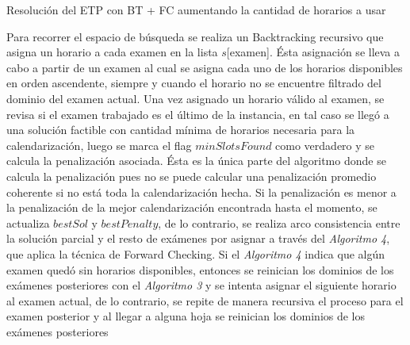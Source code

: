 \documentclass[letter, 10pt]{article}
\begin{document}
\begin{algorithm}[H]
\SetAlgoLined
{}
\caption{Resolución del ETP con BT + FC aumentando la cantidad de horarios a usar}
\end{algorithm}

\vspace*{0.4cm}
Para recorrer el espacio de búsqueda se realiza un Backtracking recursivo que asigna un horario a cada examen en la lista $s$[examen]. Ésta asignación se lleva a cabo a partir de un examen al cual se asigna cada uno de los horarios disponibles en orden ascendente, siempre y cuando el horario no se encuentre filtrado del dominio del examen actual. Una vez asignado un horario válido al examen, se revisa si el examen trabajado es el último de la instancia, en tal caso se llegó a una solución factible con cantidad mínima de horarios necesaria para la calendarización, luego se marca el flag $minSlotsFound$ como verdadero y se calcula la penalización asociada. Ésta es la única parte del algoritmo donde se calcula la penalización pues no se puede calcular una penalización promedio coherente si no está toda la calendarización hecha. Si la penalización es menor a la penalización de la mejor calendarización encontrada hasta el momento, se actualiza $bestSol$ y $bestPenalty$, de lo contrario, se realiza arco consistencia entre la solución parcial y el resto de exámenes por asignar a través del \textit{Algoritmo 4}, que aplica la técnica de Forward Checking. Si el \textit{Algoritmo 4} indica que algún examen quedó sin horarios disponibles, entonces se reinician los dominios de los exámenes posteriores con el \textit{Algoritmo 3} y se intenta asignar el siguiente horario al examen actual, de lo contrario, se repite de manera recursiva el proceso para el examen posterior y al llegar a alguna hoja se reinician los dominios de los exámenes posteriores\\
\end{document}
